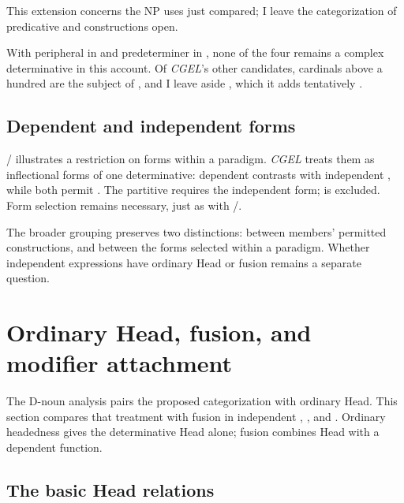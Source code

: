 \documentclass[12pt]{article}
\begin{document}
This extension concerns the NP uses just compared; I leave the categorization of predicative  and  constructions open.

With peripheral  in  and predeterminer  in , none of the four remains a complex determinative in this account. Of \textit{CGEL}'s other candidates, cardinals above a hundred are the subject of \textcite{reynolds2026numerals}, and I leave aside , which it adds tentatively \citep[393]{huddleston2002}.

\subsection{Dependent and independent forms}\label{sec:form-selection}

/ illustrates a restriction on forms within a paradigm. \textit{CGEL} treats them as inflectional forms of one determinative: dependent  contrasts with independent , while both permit  \citep[389--390]{huddleston2002}. The partitive  requires the independent form;  is excluded. Form selection remains necessary, just as with /.

The broader grouping preserves two distinctions: between members' permitted constructions, and between the forms selected within a paradigm. Whether independent expressions have ordinary Head or fusion remains a separate question.

\section{Ordinary Head, fusion, and modifier attachment}\label{sec:evidence}

The D-noun analysis pairs the proposed categorization with ordinary Head. This section compares that treatment with fusion in independent , , and . Ordinary headedness gives the determinative Head alone; fusion combines Head with a dependent function.

\subsection{The basic Head relations}\label{sec:head-relations}
\end{document}
